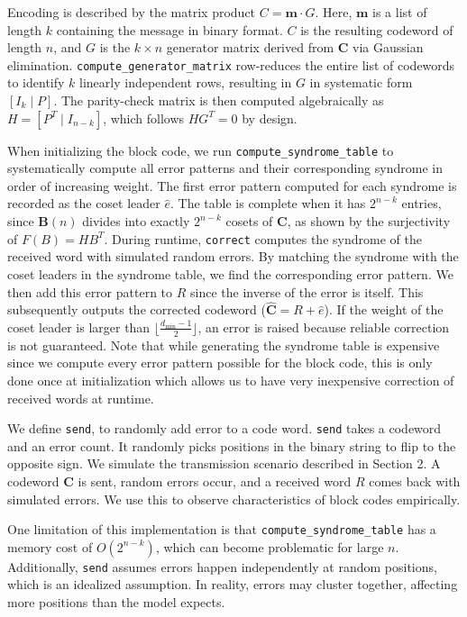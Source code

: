 \documentclass{article}
\begin{document}
Encoding is described by the matrix product $C = \mathbf{m} \cdot G$. Here, $\mathbf{m}$ is a list of 
length $k$ containing the message in binary format. $C$ is the resulting codeword of length $n$, and $G$ is 
the $k \times n$ generator matrix derived from $\mathbf{C}$ via Gaussian elimination. 
\texttt{compute\_generator\_matrix} row-reduces the entire list of codewords to identify $k$ linearly
independent rows, resulting in $G$ in systematic form $[I_k \mid P]$. The parity-check matrix is then
computed algebraically as $H = [P^T \mid I_{n-k}]$, which follows $HG^T = 0$ by design.

When initializing the block code, we run \texttt{compute\_syndrome\_table} to systematically compute all error
patterns and their corresponding syndrome in order of increasing weight. The first error pattern computed for 
each syndrome is recorded as the coset leader $\hat{e}$. The table is complete when it has $2^{n-k}$ entries, since 
$\mathbf{B}(n)$ divides into exactly $2^{n-k}$ cosets of $\mathbf{C}$, as shown by the surjectivity of 
$F(B) = HB^T$. During runtime, \texttt{correct} computes the syndrome of the received word with simulated 
random errors. By matching the syndrome with the coset leaders in the syndrome table, we find the corresponding 
error pattern. We then add this error pattern to $R$ since the inverse of the error is itself. This 
subsequently outputs the corrected codeword ($\hat{\mathbf{C}} = R + \hat{e}$). If the weight of the coset 
leader is larger than $\lfloor \frac{d_{\min}-1}{2} \rfloor$, an error is raised because reliable correction 
is not guaranteed. Note that while generating the syndrome table is expensive since we compute every 
error pattern possible for the block code, this is only done once at initialization which allows us to have very 
inexpensive correction of received words at runtime.

We define \texttt{send}, to randomly add error to a code word. \texttt{send} takes a codeword and an error count.
It randomly picks positions in the binary string to flip to the opposite sign. 
We simulate the transmission scenario described in Section 2. A codeword $\mathbf{C}$ is sent, random errors occur,
and a received word $R$ comes back with simulated errors. We use this to observe characteristics of block codes
empirically.

One limitation of this implementation is that \texttt{compute\_syndrome\_table} has a memory cost 
of $O(2^{n-k})$, which can become problematic for large $n$. Additionally, \texttt{send} assumes
errors happen independently at random positions, which is an idealized assumption. In reality, 
errors may cluster together, affecting more positions than the model expects.
\end{document}
